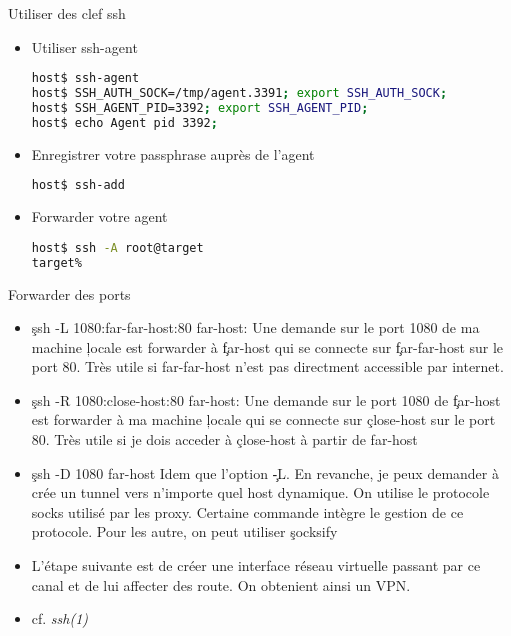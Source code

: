 \begin{frame}[fragile=singleslide]{Utiliser des clef ssh}
  \begin{itemize}
  \item Utiliser ssh-agent
\begin{lstlisting}[language=sh]
host$ ssh-agent
host$ SSH_AUTH_SOCK=/tmp/agent.3391; export SSH_AUTH_SOCK;
host$ SSH_AGENT_PID=3392; export SSH_AGENT_PID;
host$ echo Agent pid 3392;
\end{lstlisting} %
  \item Enregistrer votre passphrase auprès de l'agent
\begin{lstlisting}[language=sh]
host$ ssh-add
\end{lstlisting} %
  \item Forwarder votre agent
\begin{lstlisting}[language=sh]
host$ ssh -A root@target
target%
\end{lstlisting} %
  \end{itemize}
\end{frame}

\begin{frame}[fragile=singleslide]{Forwarder des ports}
  \begin{itemize}
  \item \c{ssh -L 1080:far-far-host:80 far-host}: Une demande sur le
    port 1080 de ma machine \c{locale} est forwarder à \c{far-host} qui se
    connecte sur \c{far-far-host} sur le port 80. Très utile si
    far-far-host n'est pas directment accessible par internet.
  \item \c{ssh -R 1080:close-host:80 far-host}: Une demande sur le
    port 1080 de \c{far-host} est forwarder à ma machine \c{locale} qui se
    connecte sur \c{close-host} sur le port 80. Très utile si je dois
    acceder à \c{close-host} à partir de far-host
  \item \c{ssh -D 1080 far-host} Idem que l'option \c{-L}. En
    revanche, je peux demander à crée un tunnel vers n'importe quel
    host dynamique. On utilise le protocole socks utilisé par les
    proxy. Certaine commande intègre le gestion de ce protocole. Pour
    les autre, on peut utiliser \c{socksify}
  \item L'étape suivante est de créer une interface réseau virtuelle
    passant par ce canal et de lui affecter des route. On obtenient
    ainsi un VPN.
    \item cf. \emph{ssh(1)}
  \end{itemize}
\end{frame}

